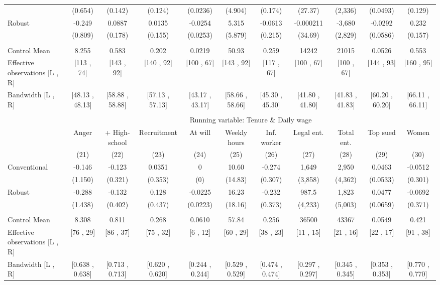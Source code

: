 \begin{tabular}{lcccccccccc}
      & (0.654) & (0.142) & (0.124) & (0.0236) & (4.904) & (0.174) & (27.37) & (2,336) & (0.0493) & (0.129) \\
Robust & -0.249 & 0.0887 & 0.0135 & -0.0254 & 5.315 & -0.0613 & -0.000211 & -3,680 & -0.0292 & 0.232 \\
      & (0.809) & (0.178) & (0.155) & (0.0253) & (5.879) & (0.215) & (34.69) & (2,829) & (0.0586) & (0.157) \\
      &       &       &       &       &       &       &       &       &       &  \\
\midrule
Control Mean & 8.255 & 0.583 & 0.202 & 0.0219 & 50.93 & 0.259 & 14242 & 21015 & 0.0526 & 0.553 \\
Effective observations [L , R] & [113 , 74] & [143 , 92] & [140 , 92] & [100 , 67] & [143 , 92] & [117 , 67] & [100 , 67] & [100 , 67] & [144 , 93] & [160 , 95] \\
Bandwidth [L , R] & [48.13 , 48.13] & [58.88 , 58.88] & [57.13 , 57.13] & [43.17 , 43.17] & [58.66 , 58.66] & [45.30 , 45.30] & [41.80 , 41.80] & [41.83 , 41.83] & [60.20 , 60.20] & [66.11 , 66.11] \\
\midrule
\midrule
      &       &       &       &       &       &       &       &       &       &  \\
\midrule
      & \multicolumn{10}{c}{Running variable: Tenure \& Daily wage} \\
\midrule
      & Anger & + High-school & Recruitment & At will  & Weekly hours & Inf. worker & Legal ent. & Total ent. & Top sued & Women \\
\midrule
      & (21)  & (22)  & (23)  & (24)  & (25)  & (26)  & (27)  & (28)  & (29)  & (30) \\
\midrule
\midrule
Conventional & -0.146 & -0.123 & 0.0351 & 0     & 10.60 & -0.274 & 1,649 & 2,950 & 0.0463 & -0.0512 \\
      & (1.150) & (0.321) & (0.353) & (0)   & (14.83) & (0.307) & (3,858) & (4,362) & (0.0533) & (0.301) \\
Robust & -0.288 & -0.132 & 0.128 & -0.0225 & 16.23 & -0.232 & 987.5 & 1,823 & 0.0477 & -0.0692 \\
      & (1.438) & (0.402) & (0.437) & (0.0223) & (18.16) & (0.373) & (4,233) & (5,003) & (0.0659) & (0.371) \\
      &       &       &       &       &       &       &       &       &       &  \\
\midrule
Control Mean & 8.308 & 0.811 & 0.268 & 0.0610 & 57.84 & 0.256 & 36500 & 43367 & 0.0549 & 0.421 \\
Effective observations [L , R] & [76 , 29] & [86 , 37] & [75 , 32] & [6 , 12] & [60 , 29] & [38 , 23] & [11 , 15] & [21 , 16] & [22 , 17] & [91 , 38] \\
Bandwidth [L , R] & [0.638 , 0.638] & [0.713 , 0.713] & [0.620 , 0.620] & [0.244 , 0.244] & [0.529 , 0.529] & [0.474 , 0.474] & [0.297 , 0.297] & [0.345 , 0.345] & [0.353 , 0.353] & [0.770 , 0.770] \\
\bottomrule
\bottomrule
\end{tabular}%
